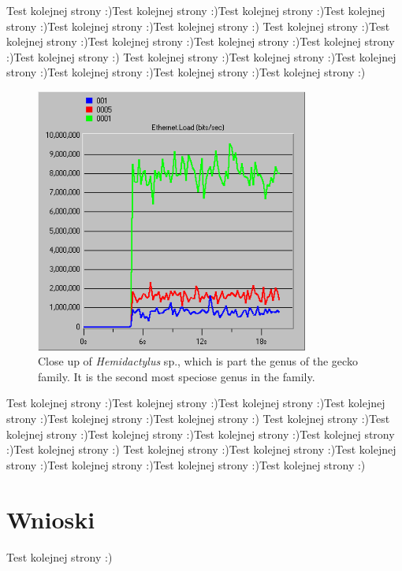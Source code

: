 \documentclass{article}
\begin{document}
Test kolejnej strony :)Test kolejnej strony :)Test kolejnej strony :)Test kolejnej strony :)Test kolejnej strony :)Test kolejnej strony :)
Test kolejnej strony :)Test kolejnej strony :)Test kolejnej strony :)Test kolejnej strony :)Test kolejnej strony :)Test kolejnej strony :)
Test kolejnej strony :)Test kolejnej strony :)Test kolejnej strony :)Test kolejnej strony :)Test kolejnej strony :)Test kolejnej strony :)
\begin{figure}[ht]
  \centering
  \includegraphics[width=0.8\textwidth]{screens/samo/load.png}
 \caption[Close up of \textit{Hemidactylus} sp.]
   {Close up of \textit{Hemidactylus} sp., which is
   part the genus of the gecko family. It is the
   second most speciose genus in the family.}
 \label{fig:example}
\end{figure}

Test kolejnej strony :)Test kolejnej strony :)Test kolejnej strony :)Test kolejnej strony :)Test kolejnej strony :)Test kolejnej strony :)
Test kolejnej strony :)Test kolejnej strony :)Test kolejnej strony :)Test kolejnej strony :)Test kolejnej strony :)Test kolejnej strony :)
Test kolejnej strony :)Test kolejnej strony :)Test kolejnej strony :)Test kolejnej strony :)Test kolejnej strony :)Test kolejnej strony :)
\section{Wnioski}


Test kolejnej strony :)
\end{document}
